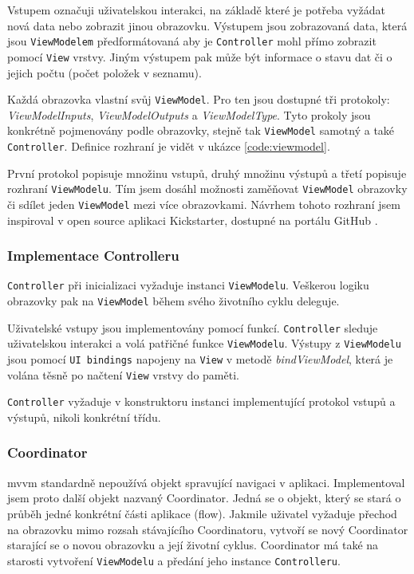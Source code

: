 Vstupem označuji uživatelskou interakci, na základě které je potřeba vyžádat nová data nebo zobrazit jinou obrazovku.
Výstupem jsou zobrazovaná data, která jsou \texttt{ViewModelem} předformátovaná aby je \texttt{Controller} mohl přímo zobrazit pomocí \texttt{View} vrstvy.
Jiným výstupem pak může být informace o stavu dat či o jejich počtu (počet položek v seznamu).

Každá obrazovka vlastní svůj \texttt{ViewModel}.
Pro ten jsou dostupné tři protokoly: \textit{ViewModelInputs}, \textit{ViewModelOutputs} a \textit{ViewModelType}.
Tyto prokoly jsou konkrétně pojmenovány podle obrazovky, stejně tak \texttt{ViewModel} samotný a také \texttt{Controller}.
Definice rozhraní je vidět v ukázce \ref{code:viewmodel}.


První protokol popisuje množinu vstupů, druhý množinu výstupů a třetí popisuje rozhraní \texttt{ViewModelu}.
Tím jsem dosáhl možnosti zaměňovat \texttt{ViewModel} obrazovky či sdílet jeden \texttt{ViewModel} mezi více obrazovkami.
Návrhem tohoto rozhraní jsem inspiroval v open source aplikaci Kickstarter, dostupné na portálu GitHub \cite{github-kickstarter}.

\subsubsection*{Implementace Controlleru}

\texttt{Controller} při inicializaci vyžaduje instanci \texttt{ViewModelu}.
Veškerou logiku obrazovky pak na \texttt{ViewModel} během svého životního cyklu deleguje.

Uživatelské vstupy jsou implementovány pomocí funkcí.
\texttt{Controller} sleduje uživatelskou interakci a volá patřičné funkce \texttt{ViewModelu}.
Výstupy z \texttt{ViewModelu} jsou pomocí \texttt{UI bindings} napojeny na \texttt{View} v metodě \textit{bindViewModel}, která je volána těsně po načtení \texttt{View} vrstvy do paměti.

\texttt{Controller} vyžaduje v konstruktoru instanci implementující protokol vstupů a výstupů, nikoli konkrétní třídu.

\subsubsection*{Coordinator}

\acrshort{mvvm} standardně nepoužívá objekt spravující navigaci v aplikaci.
Implementoval jsem proto další objekt nazvaný Coordinator.
Jedná se o objekt, který se stará o průběh jedné konkrétní části aplikace (flow).
Jakmile uživatel vyžaduje přechod na obrazovku mimo rozsah stávajícího Coordinatoru, vytvoří se nový Coordinator starající se o novou obrazovku a její životní cyklus.
Coordinator má také na starosti vytvoření \texttt{ViewModelu} a předání jeho instance \texttt{Controlleru}.

